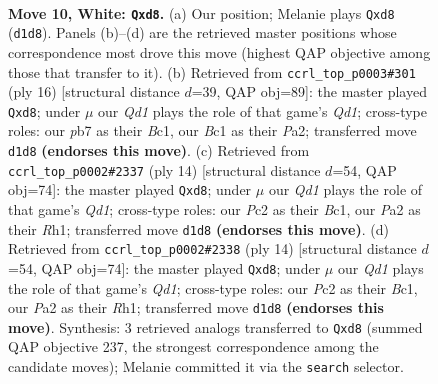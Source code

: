 \documentclass[11pt]{article}
\begin{document}
\clearpage

\begin{figure}[p]\centering
\begin{subfigure}{0.46\textwidth}\centering
\resizebox{\linewidth}{!}{%
\newchessgame
\chessboard[
  setfen={rnbq1rk1/pp3pb1/2p2np1/4p2p/4P3/2N2N2/PPP1BPPP/R1BQRK2 w - - 0 10},
  showmover=false,
  pgfstyle=straightmove, color=movearrow, markmove={d1-d8}
]}
\caption{}
\end{subfigure}\hfill
\begin{subfigure}{0.46\textwidth}\centering
\resizebox{\linewidth}{!}{%
\newchessgame
\chessboard[
  setfen={rnbq1rk1/1pp2pbp/p4np1/4p3/2P1P3/2N2N2/PP2BPPP/R1BQ1RK1 w - - 0 9},
  showmover=false,
  pgfstyle=straightmove, color=movearrow, markmove={d1-d8}
]}
\caption{}
\end{subfigure}
\\[4pt]
\begin{subfigure}{0.46\textwidth}\centering
\resizebox{\linewidth}{!}{%
\newchessgame
\chessboard[
  setfen={rnbq1rk1/ppp2pbp/5np1/4p3/2P1P3/2N2N2/PP2BPPP/R1BQK2R w KQ - 0 8},
  showmover=false,
  pgfstyle=straightmove, color=movearrow, markmove={d1-d8}
]}
\caption{}
\end{subfigure}\hfill
\begin{subfigure}{0.46\textwidth}\centering
\resizebox{\linewidth}{!}{%
\newchessgame
\chessboard[
  setfen={rnbq1rk1/ppp2pbp/5np1/4p3/2P1P3/2N2N2/PP2BPPP/R1BQK2R w KQ - 0 8},
  showmover=false,
  pgfstyle=straightmove, color=movearrow, markmove={d1-d8}
]}
\caption{}
\end{subfigure}
\caption{\textbf{Move 10, White: \texttt{Qxd8}.} (a) Our position; Melanie plays \texttt{Qxd8} (\texttt{d1d8}). Panels (b)--(d) are the retrieved master positions whose correspondence most drove this move (highest QAP objective among those that transfer to it). (b) Retrieved from \texttt{ccrl\_top\_p0003\#301} (ply 16) [structural distance $d$=39, QAP obj=89]: the master played \texttt{Qxd8}; under $\mu$ our \emph{Qd1} plays the role of that game's \emph{Qd1}; cross-type roles: our \emph{p}b7 as their \emph{B}c1, our \emph{B}c1 as their \emph{P}a2; transferred move \texttt{d1d8} \textbf{(endorses this move)}. (c) Retrieved from \texttt{ccrl\_top\_p0002\#2337} (ply 14) [structural distance $d$=54, QAP obj=74]: the master played \texttt{Qxd8}; under $\mu$ our \emph{Qd1} plays the role of that game's \emph{Qd1}; cross-type roles: our \emph{P}c2 as their \emph{B}c1, our \emph{P}a2 as their \emph{R}h1; transferred move \texttt{d1d8} \textbf{(endorses this move)}. (d) Retrieved from \texttt{ccrl\_top\_p0002\#2338} (ply 14) [structural distance $d$=54, QAP obj=74]: the master played \texttt{Qxd8}; under $\mu$ our \emph{Qd1} plays the role of that game's \emph{Qd1}; cross-type roles: our \emph{P}c2 as their \emph{B}c1, our \emph{P}a2 as their \emph{R}h1; transferred move \texttt{d1d8} \textbf{(endorses this move)}. Synthesis: 3 retrieved analogs transferred to \texttt{Qxd8} (summed QAP objective 237, the strongest correspondence among the candidate moves); Melanie committed it via the \texttt{search} selector.}
\label{fig:thought-m18}
\end{figure}
\end{document}
